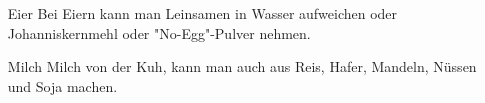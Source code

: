\begin{enumerate}
	\item[Eier] Bei Eiern kann man Leinsamen in Wasser aufweichen oder Johanniskernmehl oder "No-Egg"-Pulver nehmen. 
	\item[Milch]  Milch von der Kuh, kann man auch aus Reis, Hafer, Mandeln, Nüssen und Soja machen. 
\end{enumerate}
